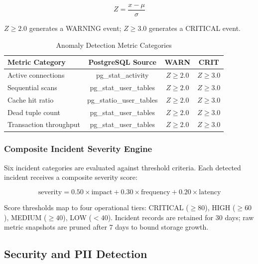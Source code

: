 \documentclass[12pt,a4paper]{report}
\begin{document}
\begin{equation}
    Z = \frac{x - \mu}{\sigma}
\end{equation}

$Z \geq 2.0$ generates a WARNING event; $Z \geq 3.0$ generates a CRITICAL event.

\begin{table}[htbp]
\caption{Anomaly Detection Metric Categories}
\label{tab:anomaly}
\centering
\begin{tabular}{lccc}
\toprule
\textbf{Metric Category} & \textbf{PostgreSQL Source} & \textbf{WARN} & \textbf{CRIT} \\
\midrule
Active connections    & pg\_stat\_activity       & $Z \geq 2.0$ & $Z \geq 3.0$ \\
Sequential scans      & pg\_stat\_user\_tables   & $Z \geq 2.0$ & $Z \geq 3.0$ \\
Cache hit ratio       & pg\_statio\_user\_tables & $Z \geq 2.0$ & $Z \geq 3.0$ \\
Dead tuple count      & pg\_stat\_user\_tables   & $Z \geq 2.0$ & $Z \geq 3.0$ \\
Transaction throughput & pg\_stat\_user\_tables  & $Z \geq 2.0$ & $Z \geq 3.0$ \\
\bottomrule
\end{tabular}
\end{table}

\subsubsection{Composite Incident Severity Engine}

Six incident categories are evaluated against threshold criteria. Each detected incident receives a composite severity score:

\begin{equation}
    \text{severity} = 0.50 \times \text{impact} + 0.30 \times \text{frequency} + 0.20 \times \text{latency}
\end{equation}

Score thresholds map to four operational tiers: CRITICAL ($\geq 80$), HIGH ($\geq 60$), MEDIUM ($\geq 40$), LOW ($< 40$). Incident records are retained for 30 days; raw metric snapshots are pruned after 7 days to bound storage growth.

\subsection{Security and PII Detection}
\end{document}
